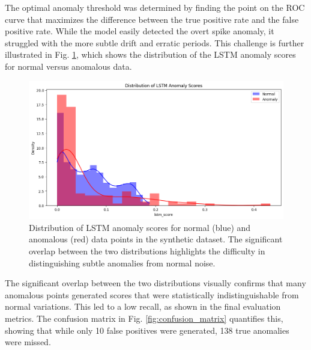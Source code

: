 \documentclass[conference]{IEEEtran}
\begin{document}
The optimal anomaly threshold was determined by finding the point on the ROC curve that maximizes the difference between the true positive rate and the false positive rate. While the model easily detected the overt spike anomaly, it struggled with the more subtle drift and erratic periods. This challenge is further illustrated in Fig. \ref{fig:data_dist}, which shows the distribution of the LSTM anomaly scores for normal versus anomalous data.

\begin{figure}[!t]
\centering
\includegraphics[width=\columnwidth]{Data_Distribution_Of_LSTM.png}
\caption{Distribution of LSTM anomaly scores for normal (blue) and anomalous (red) data points in the synthetic dataset. The significant overlap between the two distributions highlights the difficulty in distinguishing subtle anomalies from normal noise.}
\label{fig:data_dist}
\end{figure}

The significant overlap between the two distributions visually confirms that many anomalous points generated scores that were statistically indistinguishable from normal variations. This led to a low recall, as shown in the final evaluation metrics. The confusion matrix in Fig. \ref{fig:confusion_matrix} quantifies this, showing that while only 10 false positives were generated, 138 true anomalies were missed.
\end{document}
